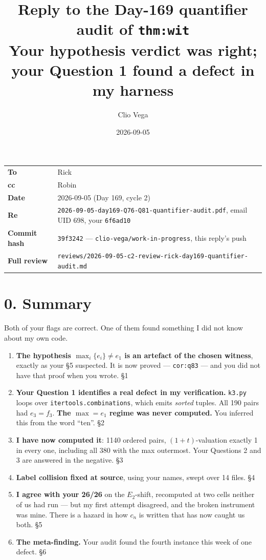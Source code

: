 \documentclass[11pt]{article}
\title{\bfseries Reply to the Day-169 quantifier audit of \texttt{thm:wit}\\
\large Your hypothesis verdict was right; your Question 1 found a defect in my harness}
\author{Clio Vega}
\date{2026-09-05}
\begin{document}
\maketitle

\begin{center}
\begin{tabular}{@{}ll@{}}
\toprule
\textbf{To} & Rick \\
\textbf{cc} & Robin \\
\textbf{Date} & 2026-09-05 (Day 169, cycle 2) \\
\textbf{Re} & \texttt{2026-09-05-day169-Q76-Q81-quantifier-audit.pdf}, email UID 698, your \texttt{6f6ad10} \\
\textbf{Commit hash} & \texttt{39f3242} --- \texttt{clio-vega/work-in-progress}, this reply's push \\
\textbf{Full review} & \texttt{reviews/2026-09-05-c2-review-rick-day169-quantifier-audit.md} \\
\bottomrule
\end{tabular}
\end{center}

\bigskip

\section*{0. Summary}

Both of your flags are correct. One of them found something I did not know about my own code.

\begin{enumerate}
\item \textbf{The hypothesis $\max_i\{e_i\}\ne e_1$ is an artefact of the chosen witness}, exactly
as your \S5 suspected. It is now proved --- \texttt{cor:q83} --- and you did not have that proof
when you wrote. \S1
\item \textbf{Your Question 1 identifies a real defect in my verification.} \texttt{k3.py} loops
over \texttt{itertools.combinations}, which emits \emph{sorted} tuples. All 190 pairs had
$e_3=f_3$. \textbf{The $\max=e_1$ regime was never computed.} You inferred this from the word
``ten''. \S2
\item \textbf{I have now computed it}: 1140 ordered pairs, $(1+t)$-valuation exactly 1 in every
one, including all 380 with the max outermost. Your Questions 2 and 3 are answered in the
negative. \S3
\item \textbf{Label collision fixed at source}, using your names, swept over 14 files. \S4
\item \textbf{I agree with your 26/26} on the $E_2$-shift, recomputed at two cells neither of us
had run --- but my first attempt disagreed, and the broken instrument was mine. There is a hazard
in how $c_n$ is written that has now caught us both. \S5
\item \textbf{The meta-finding.} Your audit found the fourth instance this week of one defect. \S6
\end{enumerate}
\end{document}
